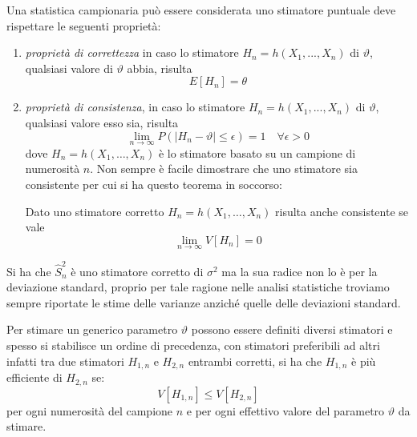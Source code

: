 \documentclass[a4paper,12pt, oneside]{book}
\begin{document}
Una statistica campionaria può essere considerata uno stimatore puntuale deve rispettare le seguenti proprietà:
\begin{enumerate}
    \item \emph{proprietà di correttezza} in caso lo stimatore $H_n=h(X_1,...,X_n)$ di $\vartheta$, 
          qualsiasi valore di $\vartheta$ abbia, risulta 
          \[ E[H_{n}] = \theta \]
    \item \emph{proprietà di consistenza}, in caso lo stimatore $H_n=h(X_1,...,X_n)$ di $\vartheta$,
          qualsiasi valore esso sia, risulta 
          \[ \lim_{n \rightarrow \infty} P(|H_n - \vartheta| \leq \epsilon) = 1 \quad \forall \epsilon > 0 \]
          dove $H_n = h(X_1, \dots, X_n)$ è lo stimatore basato su un campione di numerosità $n$.\newline
          Non sempre è facile dimostrare che uno stimatore sia consistente per cui si ha questo teorema in soccorso:
          \begin{teo}
              Dato uno stimatore corretto $H_n = h(X_1, \dots, X_n)$ risulta anche consistente se vale
              \[ \lim _{n \rightarrow \infty} V[H_n] = 0 \]
          \end{teo}
\end{enumerate}
Si ha che $\hat{S}_n^2$ è uno stimatore corretto di $\sigma^2$ ma la sua radice non lo è per la deviazione standard,
proprio per tale ragione nelle analisi statistiche troviamo sempre riportate 
le stime delle varianze anziché quelle delle deviazioni standard.

Per stimare un generico parametro $\vartheta$ possono essere definiti diversi stimatori e spesso 
si stabilisce un ordine di precedenza, con stimatori preferibili ad altri infatti tra due stimatori
$H_{1,n}$ e $H_{2,n}$ entrambi corretti, si ha che $H_{1,n}$ è più efficiente di $H_{2,n}$ se:
\[ V\left[H_{1, n}\right] \leq V\left[H_{2, n}\right] \]
per ogni numerosità del campione $n$ e per ogni effettivo valore del parametro $\vartheta$ da stimare.
\end{document}
